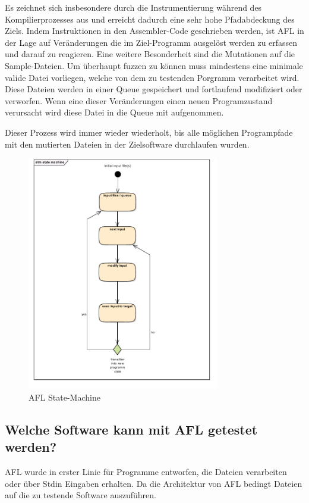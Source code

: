 \documentclass[12pt,a4paper]{scrreprt}
\begin{document}
Es zeichnet sich insbesondere durch die Instrumentierung während des Kompilierprozesses aus und erreicht dadurch eine sehr hohe Pfadabdeckung des Ziels. Indem Instruktionen in den Assembler-Code geschrieben werden, ist AFL in der Lage auf Veränderungen die im Ziel-Programm ausgelöst werden zu erfassen und darauf zu reagieren.
Eine weitere Besonderheit sind die Mutationen auf die Sample-Dateien. Um überhaupt fuzzen zu können muss mindestens eine minimale valide Datei vorliegen, welche von dem zu testenden Porgramm verarbeitet wird. Diese Dateien werden in einer Queue gespeichert und fortlaufend modifiziert oder verworfen. Wenn eine dieser Veränderungen einen neuen Programzustand verursacht wird diese Datei in die Queue mit aufgenommen.

Dieser Prozess wird immer wieder wiederholt, bis alle möglichen Programpfade mit den mutierten Dateien in der Zielsoftware durchlaufen wurden.



\begin{figure}[htbp] 
  \centering
     \includegraphics[width=0.75\textwidth]{state_machine.png}
  \caption{AFL State-Machine}
  \label{fig:Bild0}
\end{figure}




\subsection{Welche Software kann mit AFL getestet werden?}
AFL wurde in erster Linie für Programme entworfen, die Dateien verarbeiten oder über Stdin Eingaben erhalten. Da die Architektur von AFL bedingt Dateien auf die zu testende Software auszuführen.
\end{document}
